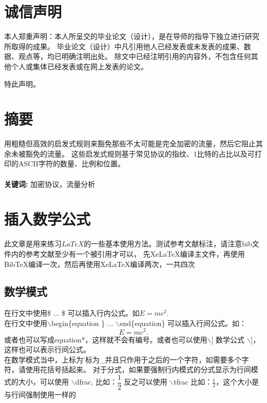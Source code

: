 \documentclass{thesis}
\begin{document}
\section*{诚信声明}
本人郑重声明：本人所呈交的毕业论文（设计），是在导师的指导下独立进行研究所取得的成果。
毕业论文（设计）中凡引用他人已经发表或未发表的成果、数据、观点等，均已明确注明出处。
除文中已经注明引用的内容外，不包含任何其他个人或集体已经发表或在网上发表的论文。\cite{sample2023}

特此声明。
\newpage
\section*{摘要} %
用粗糙但高效的启发式规则来豁免那些不太可能是完全加密的流量，然后它阻止其余未被豁免的流量。
这些启发式规则基于常见协议的指纹、1比特的占比以及可打印的ASCII字符的数量、比例和位置。\\ \\
\noindent \textbf{关键词:} 加密协议，流量分析

\newpage
\tableofcontents
\newpage

\section{插入数学公式}
此文章是用来练习$LaTeX$的一些基本使用方法。测试参考文献标注，请注意bib文件内的参考文献至少有一个被引用才可以，
先XeLaTeX编译主文件，再使用BibTeX编译一次，然后再使用XeLaTeX编译两次，一共四次\cite{sample2023}
\subsection{数学模式}
在行文中使用\$ ... \$ 可以插入行内公式。如$E=mc^2$.\\
在行文中使用$\backslash$begin\{equation \} ... $\backslash$end\{equation\} 可以插入行间公式。如：
\begin{equation}
E=mc^2.
\end{equation}
或者也可以写成equation*，这样就不会有编号。或者也可以使用$\backslash$[ 数学公式 $\backslash$]，
这样也可以表示行间公式。\\在数学模式当中，上标为\^下标为\_并且只作用于之后的一个字符，如需要多个字符，请使用花括号括起来。
对于分式，如果要强制行内模式的分式显示为行间模式的大小，可以使用 $\backslash$dfrac, 
比如：$ \dfrac{1}{2} $
反之可以使用 $\backslash$tfrac
比如：$ \tfrac{1}{2} $，这个大小是与行间强制使用一样的
\end{document}
